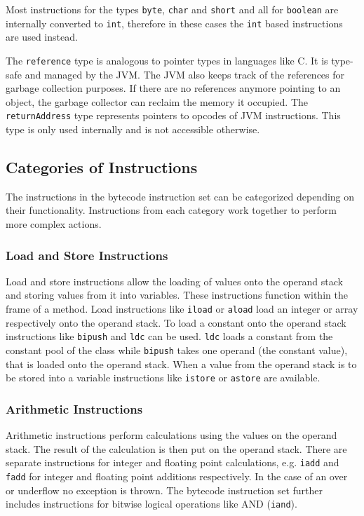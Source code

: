 Most instructions for the types \texttt{byte}, \texttt{char} and \texttt{short} and all for \texttt{boolean} are internally converted to \texttt{int}, therefore in these cases the \texttt{int} based instructions are used instead.

The \texttt{reference} type is analogous to pointer types in languages like C. It is type-safe and managed by the JVM. The JVM also keeps track of the references for garbage collection purposes. If there are no references anymore pointing to an object, the garbage collector can reclaim the memory it occupied. The \texttt{returnAddress} type represents pointers to opcodes of JVM instructions. This type is only used internally and is not accessible otherwise.


\subsection{Categories of Instructions}

The instructions in the bytecode instruction set can be categorized depending on their functionality. Instructions from each category work together to perform more complex actions. 

\subsubsection{Load and Store Instructions}

Load and store instructions allow the loading of values onto the operand stack and storing values from it into variables. These instructions function within the frame of a method. Load instructions like \texttt{iload} or \texttt{aload} load an integer or array respectively onto the operand stack. To load a constant onto the operand stack instructions like \texttt{bipush} and \texttt{ldc} can be used. \texttt{ldc} loads a constant from the constant pool of the class while \texttt{bipush} takes one operand (the constant value), that is loaded onto the operand stack. When a value from the operand stack is to be stored into a variable instructions like \texttt{istore} or \texttt{astore} are available. 

\subsubsection{Arithmetic Instructions}

Arithmetic instructions perform calculations using the values on the operand stack. The result of the calculation is then put on the operand stack. There are separate instructions for integer and floating point calculations, e.g. \texttt{iadd} and \texttt{fadd} for integer and floating point additions respectively. In the case of an over or underflow no exception is thrown. The bytecode instruction set further includes instructions for bitwise logical operations like AND (\texttt{iand}). 

